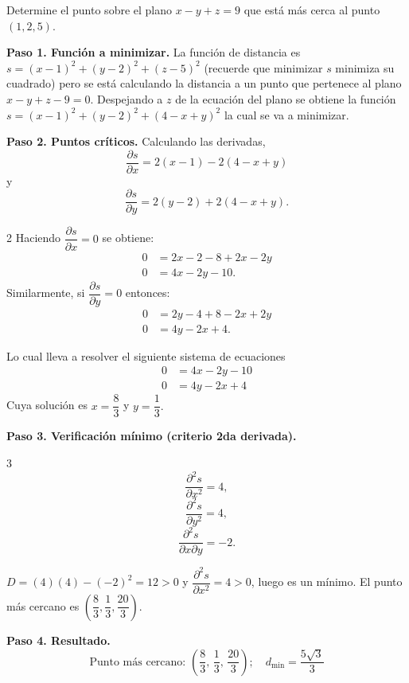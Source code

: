 \begin{prob}
Determine el punto sobre el plano $x-y+z=9$ que está más cerca al punto $(1,2,5).$
\begin{myproof}
\textbf{Paso 1. Función a minimizar.}
La función de distancia es $s=(x-1)^2+(y-2)^2+(z-5)^2$ (recuerde que minimizar $s$ minimiza su cuadrado) pero se está calculando la distancia a un punto que pertenece al plano $x-y+z-9=0.$ Despejando a $z$ de la ecuación del plano se obtiene la función $s=(x-1)^2+(y-2)^2+(4-x+y)^2$ la cual se va a minimizar.

\textbf{Paso 2. Puntos críticos.}
Calculando las derivadas, $$\dfrac{\partial s}{\partial x}=2(x-1)-2(4-x+y)$$ y  $$\dfrac{\partial s}{\partial y}=2(y-2)+2(4-x+y).$$
\begin{multicols}{2}
Haciendo $\dfrac{\partial s}{\partial x}=0$ se obtiene:
\begin{align*}
0&=2x-2-8+2x-2y\\
0&=4x-2y-10.
\end{align*}
\columnbreak
Similarmente, si $\dfrac{\partial s}{\partial y}=0$ entonces:
\begin{align*}
0&=2y-4+8-2x+2y\\
0&=4y-2x+4.
\end{align*}
\end{multicols}
Lo cual lleva a resolver el siguiente sistema de ecuaciones
\begin{align*}
0&=4x-2y-10\\0&=4y-2x+4
\end{align*}
Cuya solución es $x=\dfrac{8}{3}$ y $y=\dfrac{1}{3}.$

\textbf{Paso 3. Verificación mínimo (criterio 2da derivada).}
\begin{multicols}{3}
$$\dfrac{\partial^2 s}{\partial x^2}=4,$$ $$\dfrac{\partial^2 s}{\partial y^2}=4,$$ $$\dfrac{\partial^2 s}{\partial x\partial y}=-2.$$
\end{multicols}
$D=\left(4\right)\left(4\right)-\left(-2\right)^2=12>0$ y $\dfrac{\partial^2 s}{\partial x^2}=4>0$, luego es un mínimo.
El punto más cercano es $\left(\dfrac{8}{3},\dfrac{1}{3},\dfrac{20}{3}\right)$.

\textbf{Paso 4. Resultado.}
\[
\boxed{\text{Punto más cercano: }\left(\dfrac{8}{3},\,\dfrac{1}{3},\,\dfrac{20}{3}\right);\quad d_{\min}=\dfrac{5\sqrt{3}}{3}}
\]
\end{myproof}
\end{prob}


